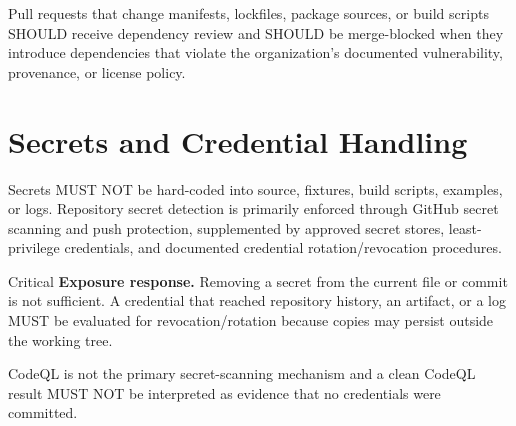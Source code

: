 \documentclass[10pt,letterpaper]{article}
\begin{document}
Pull requests that change manifests, lockfiles, package sources, or build scripts SHOULD receive dependency review and SHOULD be merge-blocked when they introduce dependencies that violate the organization's documented vulnerability, provenance, or license policy.

\section{Secrets and Credential Handling}
Secrets MUST NOT be hard-coded into source, fixtures, build scripts, examples, or logs. Repository secret detection is primarily enforced through GitHub secret scanning and push protection, supplemented by approved secret stores, least-privilege credentials, and documented credential rotation/revocation procedures.

\begin{callout}{Critical}
\textbf{Exposure response.} Removing a secret from the current file or commit is not sufficient. A credential that reached repository history, an artifact, or a log MUST be evaluated for revocation/rotation because copies may persist outside the working tree.
\end{callout}

CodeQL is not the primary secret-scanning mechanism and a clean CodeQL result MUST NOT be interpreted as evidence that no credentials were committed.
\end{document}
